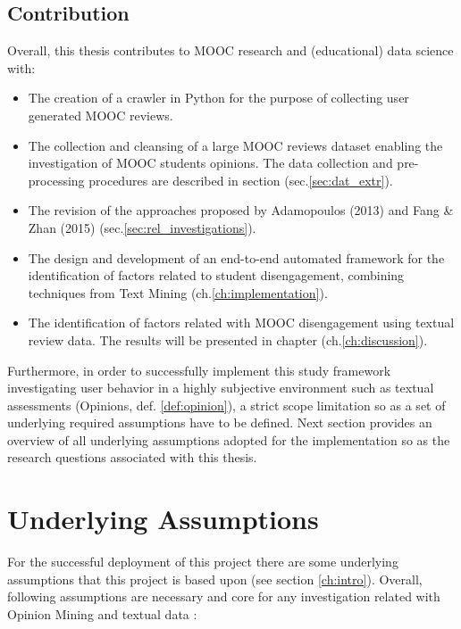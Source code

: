 \documentclass[
	a4paper,
	pdftex,
	12pt,	
	footinclude=true,
	fleqn,
	final,
	]{report}%
\begin{document}
\subsection{Contribution}
\vspace{-0.3cm}
Overall, this thesis contributes to MOOC research and (educational) data science with:
\begin{itemize}
  \item The creation of a crawler in Python for the purpose of collecting 
 user generated MOOC reviews.
 \item The collection and cleansing of a large MOOC reviews dataset enabling 
 the investigation of MOOC students opinions. The data collection and pre-processing 
 procedures are described in section (sec.\ref{sec:dat_extr}). 
 \item The revision of the approaches proposed by Adamopoulos (2013)
 and Fang \& Zhan (2015) (sec.\ref{sec:rel_investigations}).  
 \item The design and development of an end-to-end automated framework for the identification of 
 factors related to student disengagement, combining techniques from Text Mining (ch.\ref{ch:implementation}).
 \item The identification of factors related with MOOC disengagement using textual review data. 
 The results will be presented in chapter (ch.\ref{ch:discussion}).
\end{itemize}

Furthermore, in order to successfully implement this study framework investigating user 
behavior in a highly subjective environment such as textual assessments 
(Opinions, def. \ref{def:opinion}), 
a strict scope limitation so as a set of underlying required assumptions 
have to be defined. Next section provides an overview of all underlying 
assumptions adopted for the implementation so as
the research questions associated with this thesis. 

\vspace{-0.45cm}
\section{Underlying Assumptions}
\label{sec:assumptions}
\vspace{-0.3cm}
For the successful deployment of this project
there are some underlying assumptions that this project is based
upon (see section \ref{ch:intro}). Overall, following assumptions are 
necessary and core for any investigation 
related with Opinion Mining and textual data \cite{Liu2012}:
\end{document}
